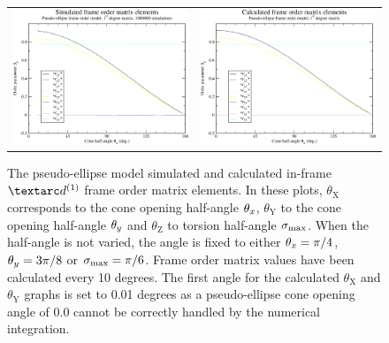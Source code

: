 \begin{figure}
\begin{tabular}{@{}cc@{}}
    \\[-5pt]
    \includegraphics[width=.5\textwidth]{images/frame_order_matrix/Sij_pseudo-ellipse_in_frame_theta_z_ens1000000.eps} &
    \includegraphics[width=.5\textwidth]{images/frame_order_matrix/Sij_pseudo-ellipse_in_frame_theta_z_calc.eps} \\
  \end{tabular}
  \caption[Pseudo-ellipse simulated and calculated in-frame Daeg$^{(1)}$ elements.]{
    The pseudo-ellipse model simulated and calculated in-frame $\FOone$ frame order matrix elements.
    In these plots, $\theta_\textrm{X}$ corresponds to the cone opening half-angle $\theta_x$, $\theta_\textrm{Y}$ to the cone opening half-angle $\theta_y$ and $\theta_\textrm{Z}$ to torsion half-angle $\sigma_\textrm{max}$.
    When the half-angle is not varied, the angle is fixed to either $\theta_x = \pi/4$, $\theta_y = 3\pi/8$ or $\sigma_\textrm{max} = \pi/6$.
    Frame order matrix values have been calculated every 10 degrees.
    The first angle for the calculated $\theta_\textrm{X}$ and $\theta_\textrm{Y}$ graphs is set to 0.01 degrees as a pseudo-ellipse cone opening angle of 0.0 cannot be correctly handled by the numerical integration.
  }
  \label{fig: simulated and calculated in-frame 1st degree pseudo-ellipse frame order}
\end{figure}

